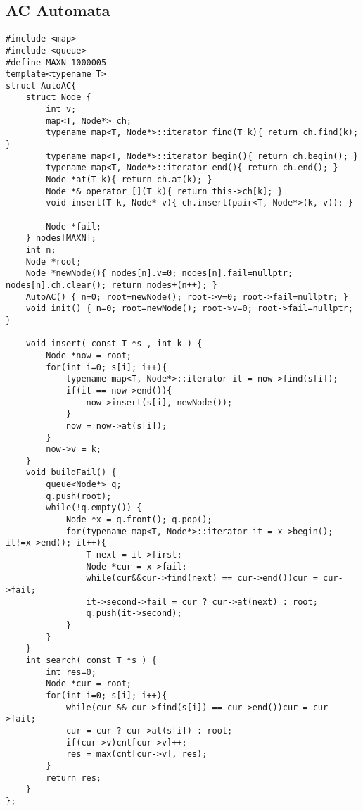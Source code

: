 \subsection{AC Automata}
\begin{lstlisting}
#include <map>
#include <queue>
#define MAXN 1000005
template<typename T>
struct AutoAC{
	struct Node {
		int v;
		map<T, Node*> ch;
		typename map<T, Node*>::iterator find(T k){ return ch.find(k); }
		typename map<T, Node*>::iterator begin(){ return ch.begin(); }
		typename map<T, Node*>::iterator end(){ return ch.end(); }
		Node *at(T k){ return ch.at(k); }
		Node *& operator [](T k){ return this->ch[k]; }
		void insert(T k, Node* v){ ch.insert(pair<T, Node*>(k, v)); }

		Node *fail;
	} nodes[MAXN];
	int n;
	Node *root;
	Node *newNode(){ nodes[n].v=0; nodes[n].fail=nullptr; nodes[n].ch.clear(); return nodes+(n++); }
	AutoAC() { n=0; root=newNode(); root->v=0; root->fail=nullptr; }
	void init() { n=0; root=newNode(); root->v=0; root->fail=nullptr; }

	void insert( const T *s , int k ) {
		Node *now = root;
		for(int i=0; s[i]; i++){
			typename map<T, Node*>::iterator it = now->find(s[i]);
			if(it == now->end()){
				now->insert(s[i], newNode());
			}
			now = now->at(s[i]);
		}
		now->v = k;
	}
	void buildFail() {
		queue<Node*> q;
		q.push(root);
		while(!q.empty()) {
			Node *x = q.front(); q.pop();
			for(typename map<T, Node*>::iterator it = x->begin(); it!=x->end(); it++){
				T next = it->first;
				Node *cur = x->fail;
				while(cur&&cur->find(next) == cur->end())cur = cur->fail;
				it->second->fail = cur ? cur->at(next) : root;
				q.push(it->second);
			}
		}
	}
	int search( const T *s ) {
		int res=0;
		Node *cur = root;
		for(int i=0; s[i]; i++){
			while(cur && cur->find(s[i]) == cur->end())cur = cur->fail;
			cur = cur ? cur->at(s[i]) : root;
			if(cur->v)cnt[cur->v]++;
			res = max(cnt[cur->v], res);
		}
		return res;
	}
};
\end{lstlisting}
